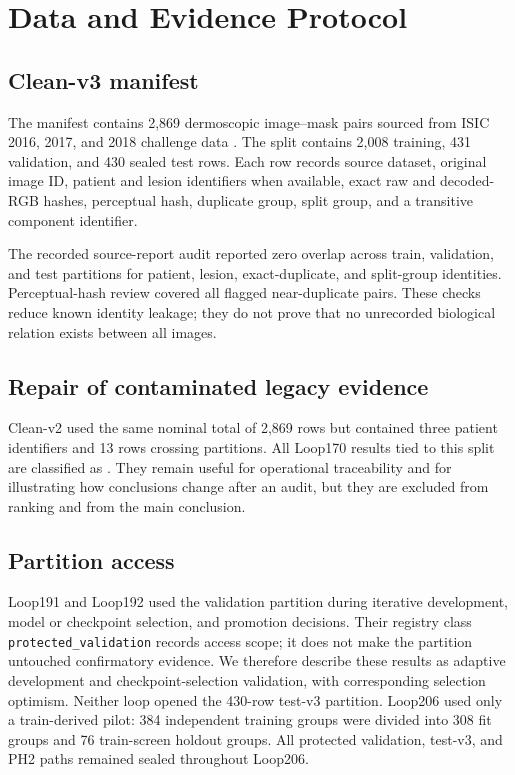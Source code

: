 \section{Data and Evidence Protocol}

\subsection{Clean-v3 manifest}

The \cleanv{} manifest contains 2,869 dermoscopic image--mask pairs sourced from ISIC 2016, 2017, and 2018 challenge data \citep{isic2016challenge,isic2017challenge,isic2018challenge}. The split contains 2,008 training, 431 validation, and 430 sealed test rows. Each row records source dataset, original image ID, patient and lesion identifiers when available, exact raw and decoded-RGB hashes, perceptual hash, duplicate group, split group, and a transitive \cleanv{} component identifier.

The recorded source-report audit reported zero overlap across train, validation, and test partitions for patient, lesion, exact-duplicate, and split-group identities. Perceptual-hash review covered all flagged near-duplicate pairs. These checks reduce known identity leakage; they do not prove that no unrecorded biological relation exists between all images.

\subsection{Repair of contaminated legacy evidence}

Clean-v2 used the same nominal total of 2,869 rows but contained three patient identifiers and 13 rows crossing partitions. All Loop170 results tied to this split are classified as . They remain useful for operational traceability and for illustrating how conclusions change after an audit, but they are excluded from \cleanv{} ranking and from the main conclusion.



\subsection{Partition access}

Loop191 and Loop192 used the \cleanv{} validation partition during iterative development, model or checkpoint selection, and promotion decisions. Their registry class \texttt{protected\_validation} records access scope; it does not make the partition untouched confirmatory evidence. We therefore describe these results as adaptive development and checkpoint-selection validation, with corresponding selection optimism. Neither loop opened the 430-row test-v3 partition. Loop206 used only a train-derived pilot: 384 independent training groups were divided into 308 fit groups and 76 train-screen holdout groups. All protected \cleanv{} validation, test-v3, and PH2 paths remained sealed throughout Loop206.

